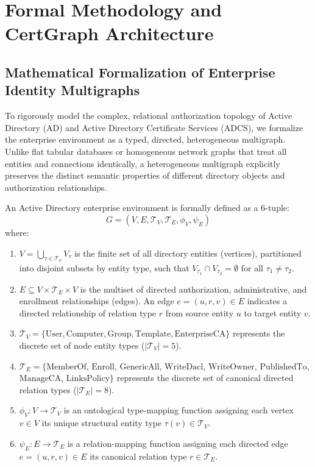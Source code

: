 \chapter{Formal Methodology and CertGraph Architecture}
\label{ch:methodology}

\section{Mathematical Formalization of Enterprise Identity Multigraphs}
To rigorously model the complex, relational authorization topology of Active Directory (AD) and Active Directory Certificate Services (ADCS), we formalize the enterprise environment as a typed, directed, heterogeneous multigraph. Unlike flat tabular databases or homogeneous network graphs that treat all entities and connections identically, a heterogeneous multigraph explicitly preserves the distinct semantic properties of different directory objects and authorization relationships.

\begin{definition}
An Active Directory enterprise environment is formally defined as a 6-tuple:
\begin{equation}
G = (V, E, \mathcal{T}_V, \mathcal{T}_E, \phi_V, \psi_E)
\end{equation}
where:
\begin{enumerate}
    \item $V = \bigcup_{\tau \in \mathcal{T}_V} V_\tau$ is the finite set of all directory entities (vertices), partitioned into disjoint subsets by entity type, such that $V_{\tau_1} \cap V_{\tau_2} = \emptyset$ for all $\tau_1 \neq \tau_2$.
    \item $E \subseteq V \times \mathcal{T}_E \times V$ is the multiset of directed authorization, administrative, and enrollment relationships (edges). An edge $e = (u, r, v) \in E$ indicates a directed relationship of relation type $r$ from source entity $u$ to target entity $v$.
    \item $\mathcal{T}_V = \{\text{User}, \text{Computer}, \text{Group}, \text{Template}, \text{EnterpriseCA}\}$ represents the discrete set of node entity types ($|\mathcal{T}_V| = 5$).
    \item $\mathcal{T}_E = \{\text{MemberOf}$, $\text{Enroll}$, $\text{GenericAll}$, $\text{WriteDacl}$, $\text{WriteOwner}$, $\text{PublishedTo}$, $\text{ManageCA}$, $\text{LinksPolicy}\}$ represents the discrete set of canonical directed relation types ($|\mathcal{T}_E| = 8$).
    \item $\phi_V: V \to \mathcal{T}_V$ is an ontological type-mapping function assigning each vertex $v \in V$ its unique structural entity type $\tau(v) \in \mathcal{T}_V$.
    \item $\psi_E: E \to \mathcal{T}_E$ is a relation-mapping function assigning each directed edge $e = (u, r, v) \in E$ its canonical relation type $r \in \mathcal{T}_E$.
\end{enumerate}
\end{definition}

